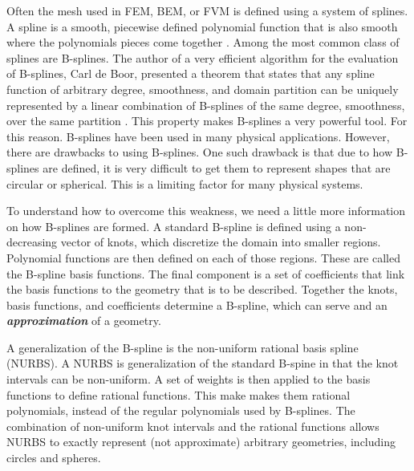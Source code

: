       Often the mesh used in FEM, BEM, or FVM is defined using a system of splines. A spline is a smooth, piecewise defined polynomial function that is also smooth where the polynomials pieces come together \cite{judd1998}. Among the most common class of splines are B-splines. The author of a very efficient algorithm for the evaluation of B-splines, Carl de Boor, presented a theorem that states that any spline function of arbitrary degree, smoothness, and domain partition can be uniquely represented by a linear combination of B-splines of the same degree, smoothness, over the same partition \cite{deBoor2001}. This property makes B-splines a very powerful tool. For this reason. B-splines have been used in many physical applications. However, there are drawbacks to using B-splines. One such drawback is that due to how B-splines are defined, it is very difficult to get them to represent shapes that are circular or spherical. This is a limiting factor for many physical systems.

      To understand how to overcome this weakness, we need a little more information on how B-splines are formed. A standard B-spline is defined using a non-decreasing vector of knots, which discretize the domain into smaller regions. Polynomial functions are then defined on each of those regions. These are called the B-spline basis functions. The final component is a set of coefficients that link the basis functions to the geometry that is to be described. Together the knots, basis functions, and coefficients determine a B-spline, which can serve and an \textbf{\textit{approximation}} of a geometry.

      A generalization of the B-spline is the non-uniform rational basis spline (NURBS). A NURBS is generalization of the standard B-spine in that the knot intervals can be non-uniform. A set of weights is then applied to the basis functions to define rational functions. This make makes them rational polynomials, instead of the regular polynomials used by B-splines. The combination of non-uniform knot intervals and the rational functions allows NURBS to exactly represent (not approximate) arbitrary geometries, including circles and spheres.

